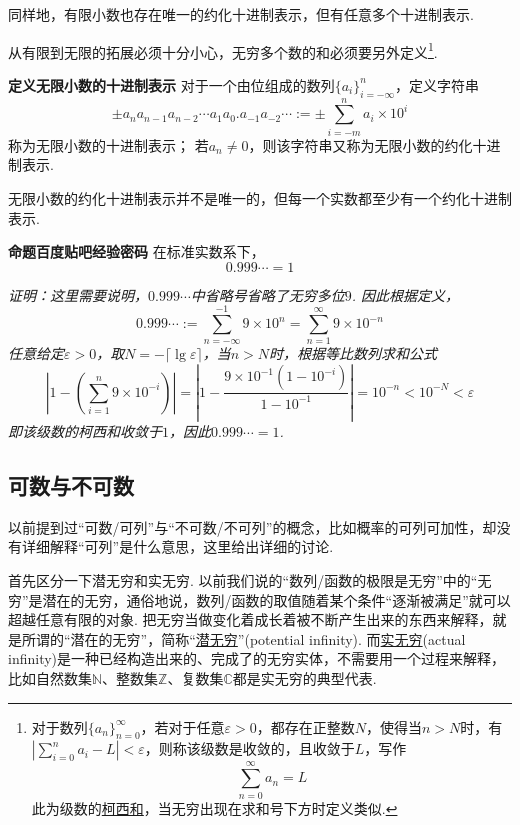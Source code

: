 \documentclass[UTF8]{ctexart}
\newenvironment{definition}[1]
    {\begin{tcolorbox}[enhanced, colback=LightYellow, breakable=false, frame hidden, borderline west={1.5mm}{-2mm}{DarkGreen}]
    {\bfseries {\color{DarkGreen} 定义}\quad #1} \newline}
    {\end{tcolorbox}}
\newenvironment{proposition}[1]
    {\begin{tcolorbox}[enhanced, colback=LightYellow, breakable=true, frame hidden, borderline west={1.5mm}{-2mm}{Purple}]
    {\bfseries {\color{Purple} 命题}\quad #1} \newline}
    {\end{tcolorbox}}
\begin{document}
同样地，有限小数也存在唯一的约化十进制表示，但有任意多个十进制表示.

从有限到无限的拓展必须十分小心，无穷多个数的和必须要另外定义\footnote{对于数列\(\{a_n\}_{n=0}^{\infty}\)，若对于任意\(\varepsilon > 0\)，都存在正整数\(N\)，使得当\(n>N\)时，有\(\displaystyle{\left|\sum_{i=0}^{n}a_i-L\right| < \varepsilon}\)，则称该级数是收敛的，且收敛于\(L\)，写作\[\sum_{n=0}^{\infty}a_n=L\]此为级数的\uline{柯西和}，当无穷出现在求和号下方时定义类似.}.

\begin{definition}{无限小数的十进制表示}
    对于一个由位组成的数列\(\{a_i\}_{i=-\infty}^n\)，定义字符串
    \[\pm a_n a_{n-1} a_{n-2} \cdots a_1 a_0.a_{-1} a_{-2} \cdots := \pm \sum_{i=-m}^{n} a_i \times 10^i\]
    称为无限小数的十进制表示；
    \newline
    若\(a_n \neq 0\)，则该字符串又称为无限小数的约化十进制表示.
\end{definition}

无限小数的约化十进制表示并不是唯一的，但每一个实数都至少有一个约化十进制表示.

\begin{proposition}{百度贴吧经验密码}
    在标准实数系下，
    \[0.999\cdots = 1\]
\end{proposition}
\textit{
    证明：这里需要说明，\(0.999\cdots\)中省略号省略了无穷多位\(9\). 因此根据定义，
    \[0.999\cdots := \sum_{n=-\infty}^{-1} 9 \times 10^{n} = \sum_{n=1}^{\infty} 9 \times 10^{-n}\]
    任意给定\(\varepsilon > 0\)，取\(N=-\lceil\lg \varepsilon\rceil\)，当\(n>N\)时，根据等比数列求和公式
    \[\left| 1-\left(\sum_{i=1}^{n} 9 \times 10^{-i}\right) \right| = \left| 1-\frac{9\times 10^{-1}(1-10^{-i})}{1-10^{-1}} \right| =10^{-n}<10^{-N}<\varepsilon\]
    即该级数的柯西和收敛于\(1\)，因此\(0.999\cdots = 1\).
}


\subsection{可数与不可数}

以前提到过“可数/可列”与“不可数/不可列”的概念，比如概率的可列可加性，却没有详细解释“可列”是什么意思，这里给出详细的讨论.

首先区分一下潜无穷和实无穷. 以前我们说的“数列/函数的极限是无穷”中的“无穷”是潜在的无穷，通俗地说，数列/函数的取值随着某个条件“逐渐被满足”就可以超越任意有限的对象. 把无穷当做变化着成长着被不断产生出来的东西来解释，就是所谓的“潜在的无穷”，简称“\uline{潜无穷}”(potential infinity). 而\uline{实无穷}(actual infinity)是一种已经构造出来的、完成了的无穷实体，不需要用一个过程来解释，比如自然数集\(\mathbb{N}\)、整数集\(\mathbb{Z}\)、复数集\(\mathbb{C}\)都是实无穷的典型代表.
\end{document}
